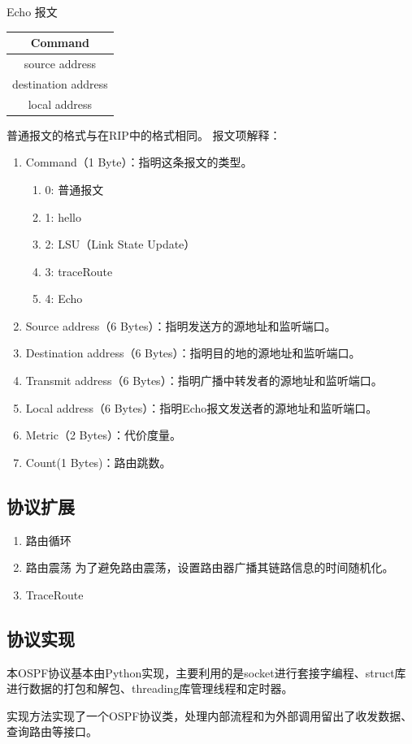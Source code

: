 	Echo 报文
	\begin{table}[H]
	\centering
		\begin{tabular}{|c|}
			\hline
			Command \\
			\hline
			source address \\
			\hline
			destination address \\
			\hline
			local address \\
			\hline
		\end{tabular}		
	\end{table}
	普通报文的格式与在RIP中的格式相同。
	报文项解释：
	\begin{enumerate}[(1)]
	\item Command（1 Byte）：指明这条报文的类型。
	\begin{enumerate}[]
		\item 0: 普通报文
		\item 1: hello
		\item 2: LSU（Link State Update）
		\item 3: traceRoute
		\item 4: Echo
	\end{enumerate}
	\item Source address（6 Bytes）：指明发送方的源地址和监听端口。
	\item Destination address（6 Bytes）：指明目的地的源地址和监听端口。
	\item Transmit address（6 Bytes）：指明广播中转发者的源地址和监听端口。
	\item Local address（6 Bytes）：指明Echo报文发送者的源地址和监听端口。
	\item Metric（2 Bytes）：代价度量。
	\item Count(1 Bytes)：路由跳数。
	\end{enumerate}
	
	\subsection{协议扩展} %
	\label{sub:协议扩展}
		\begin{enumerate}
			\item 路由循环
			\item 路由震荡
				为了避免路由震荡，设置路由器广播其链路信息的时间随机化。
			\item TraceRoute
		\end{enumerate}
	\subsection{协议实现} %
	\label{sub:协议实现}
		本OSPF协议基本由Python实现，主要利用的是socket进行套接字编程、struct库进行数据的打包和解包、threading库管理线程和定时器。
		\par 实现方法实现了一个OSPF协议类，处理内部流程和为外部调用留出了收发数据、查询路由等接口。
